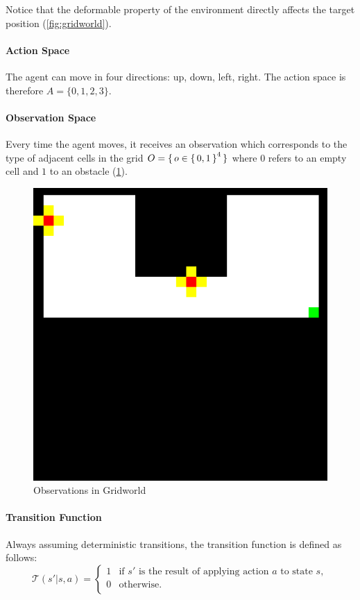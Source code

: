 Notice that the deformable property of the environment directly affects the target position (\cref{fig:gridworld}).

\paragraph{Action Space}

The agent can move in four directions: up, down, left, right. The action space is therefore $A = \{0,1,2,3\}$.

\paragraph{Observation Space}

Every time the agent moves, it receives an observation which corresponds to the type of adjacent cells 
in the grid $O = \set{o \in \set{0,1}^4 }$ where $0$ refers to an empty cell and $1$ to 
an obstacle (\cref{fig:observationgridworld}). 

\begin{figure}[H]
    \centering
    \includegraphics[scale=.25]{images/gridworld_observation.png}
    \caption{Observations in Gridworld}
    \label{fig:observationgridworld}
\end{figure}


\paragraph{Transition Function}
Always assuming deterministic transitions, the transition function is defined as follows:
$$\mathcal{T}(s'|s,a) =
\begin{cases}
    1 &   \text{if } s' \text{ is the result of applying action } a \text{ to state } s, \\
    0 &   \text{otherwise}. \\
\end{cases}
$$

